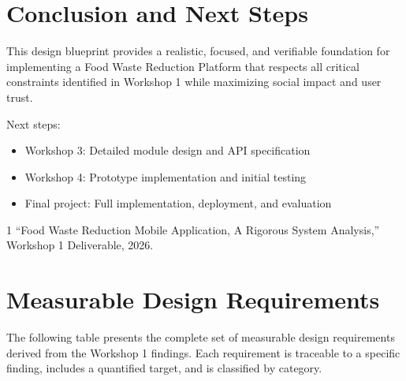 \documentclass[conference]{IEEEtran}
\begin{document}
\section{Conclusion and Next Steps}

This design blueprint provides a realistic, focused, and verifiable foundation for implementing a Food Waste Reduction Platform that respects all critical constraints identified in Workshop 1 while maximizing social impact and user trust.

Next steps:
\begin{itemize}
    \item Workshop 3: Detailed module design and API specification
    \item Workshop 4: Prototype implementation and initial testing
    \item Final project: Full implementation, deployment, and evaluation
\end{itemize}

\begin{thebibliography}{1}
 ``Food Waste Reduction Mobile Application, A Rigorous System Analysis,'' Workshop 1 Deliverable, 2026.
\end{thebibliography}

\appendix

\section{Measurable Design Requirements}
\label{app:requirements}

The following table presents the complete set of measurable design requirements derived from the Workshop 1 findings. Each requirement is traceable to a specific finding, includes a quantified target, and is classified by category.
\end{document}
